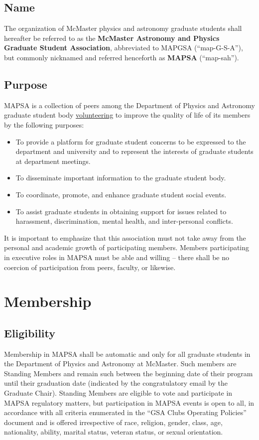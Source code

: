 \documentclass[8pt]{article}
\begin{document}
	\subsection{Name}
	The organization of McMaster physics and astronomy graduate students shall hereafter be referred to as the \textbf{McMaster Astronomy and Physics Graduate Student Association}, abbreviated to MAPGSA (``map-G-S-A''), but commonly nicknamed and referred henceforth as \textbf{MAPSA} (``map-sah'').
	\subsection{Purpose}
	MAPSA is a collection of peers among the Department of Physics and Astronomy graduate student body \underline{volunteering} to improve the quality of life of its members by the following purposes:
	\begin{itemize}
		\item To provide a platform for graduate student concerns to be expressed to the department and university and to represent the interests of graduate students at department meetings.
		\item To disseminate important information to the graduate student body.
		\item To coordinate, promote, and enhance graduate student social events.
		\item To assist graduate students in obtaining support for issues related to harassment, discrimination, mental health, and inter-personal conflicts.
	\end{itemize}
	It is important to emphasize that this association must not take away from the personal and academic growth of participating members. Members participating in executive roles in MAPSA must be able and willing -- there shall be no coercion of participation from peers, faculty, or likewise.
	
	\section{Membership}
	\subsection{Eligibility}
	Membership in MAPSA shall be automatic and only for all graduate students in the Department of Physics and Astronomy at McMaster. Such members are Standing Members and remain such between the beginning date of their program until their graduation date (indicated by the congratulatory email by the Graduate Chair). Standing Members are eligible to vote and participate in MAPSA regulatory matters, but participation in MAPSA events is open to all, in accordance with all criteria enumerated in the ``GSA Clubs Operating Policies'' document and is offered irrespective of race, religion, gender, class, age, nationality, ability, marital status, veteran status, or sexual orientation. 
	
\end{document}
